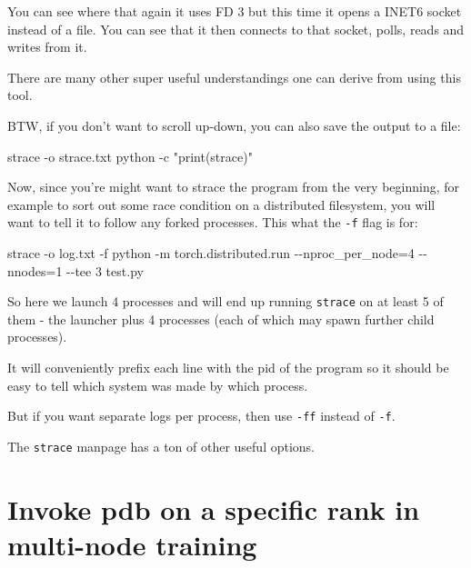 \documentclass[
]{report}
\newenvironment{Shaded}{\begin{snugshade}}{\end{snugshade}}
\newcommand{\AttributeTok}[1]{\textcolor[rgb]{0.40,0.45,0.13}{#1}}
\newcommand{\ExtensionTok}[1]{\textcolor[rgb]{0.00,0.23,0.31}{#1}}
\newcommand{\NormalTok}[1]{\textcolor[rgb]{0.00,0.23,0.31}{#1}}
\newcommand{\OperatorTok}[1]{\textcolor[rgb]{0.37,0.37,0.37}{#1}}
\newcommand{\StringTok}[1]{\textcolor[rgb]{0.13,0.47,0.30}{#1}}
\begin{document}
You can see where that again it uses FD 3 but this time it opens a INET6
socket instead of a file. You can see that it then connects to that
socket, polls, reads and writes from it.

There are many other super useful understandings one can derive from
using this tool.

BTW, if you don't want to scroll up-down, you can also save the output
to a file:

\begin{Shaded}
\begin{Highlighting}[]
\ExtensionTok{strace} \AttributeTok{{-}o}\NormalTok{ strace.txt python }\AttributeTok{{-}c} \StringTok{"print(\textquotesingle{}strace\textquotesingle{})"}
\end{Highlighting}
\end{Shaded}

Now, since you're might want to strace the program from the very
beginning, for example to sort out some race condition on a distributed
filesystem, you will want to tell it to follow any forked processes.
This what the \texttt{-f} flag is for:

\begin{Shaded}
\begin{Highlighting}[]
\ExtensionTok{strace} \AttributeTok{{-}o}\NormalTok{ log.txt }\AttributeTok{{-}f}\NormalTok{ python }\AttributeTok{{-}m}\NormalTok{ torch.distributed.run }\AttributeTok{{-}{-}nproc\_per\_node}\OperatorTok{=}\NormalTok{4 }\AttributeTok{{-}{-}nnodes}\OperatorTok{=}\NormalTok{1 }\AttributeTok{{-}{-}tee}\NormalTok{ 3 test.py}
\end{Highlighting}
\end{Shaded}

So here we launch 4 processes and will end up running \texttt{strace} on
at least 5 of them - the launcher plus 4 processes (each of which may
spawn further child processes).

It will conveniently prefix each line with the pid of the program so it
should be easy to tell which system was made by which process.

But if you want separate logs per process, then use \texttt{-ff} instead
of \texttt{-f}.

The \texttt{strace} manpage has a ton of other useful options.

\section{Invoke pdb on a specific rank in multi-node
training}\label{invoke-pdb-on-a-specific-rank-in-multi-node-training}
\end{document}
